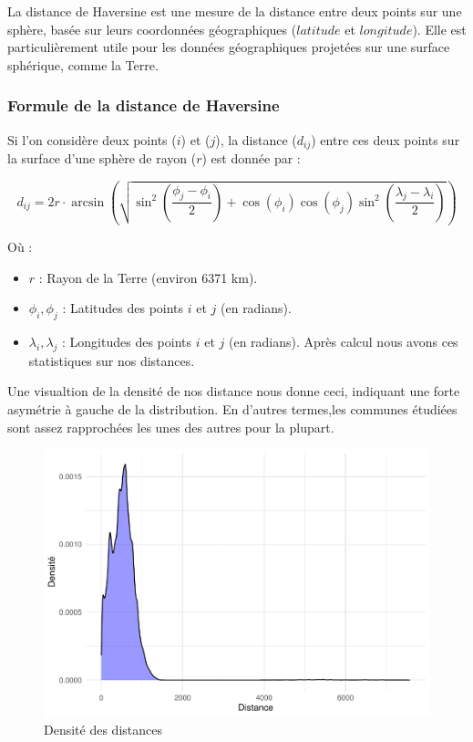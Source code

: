 La distance de Haversine est une mesure de la distance entre deux points
sur une sphère, basée sur leurs coordonnées géographiques (\(latitude\)
et \(longitude\)). Elle est particulièrement utile pour les données
géographiques projetées sur une surface sphérique, comme la Terre.

\subsubsection{Formule de la distance de
Haversine}\label{formule-de-la-distance-de-haversine}

Si l'on considère deux points (\(i\)) et (\(j\)), la distance
(\(d_{ij}\)) entre ces deux points sur la surface d'une sphère de rayon
(\(r\)) est donnée par :

\[
 d_{ij} = 2r \cdot \arcsin\left(\sqrt{\sin^2\left(\frac{\phi_j - \phi_i}{2}\right) + \cos(\phi_i)\cos(\phi_j)\sin^2\left(\frac{\lambda_j - \lambda_i}{2}\right)}\right)
\]

Où :

\begin{itemize}
\item
  \(r\) : Rayon de la Terre (environ 6371 km).
\item
  \(\phi_i, \phi_j\) : Latitudes des points \(i\) et \(j\) (en radians).
\item
  \(\lambda_i, \lambda_j\) : Longitudes des points \(i\) et \(j\) (en
  radians). Après calcul nous avons ces statistiques sur nos distances.
\end{itemize}

Une visualtion de la densité de nos distance nous donne ceci, indiquant
une forte asymétrie à gauche de la distribution. En d'autres termes,les
communes étudiées sont assez rapprochées les unes des autres pour la
plupart.

\begin{figure}

{\centering \includegraphics{4_Analyse_Descriptive_files/figure-latex/unnamed-chunk-14-1} 

}

\caption{Densité des distances}\label{fig:unnamed-chunk-14}
\end{figure}

